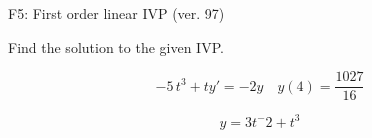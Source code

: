 \begin{exercise}
  \begin{exerciseTitle}F5: First order linear IVP (ver. 97)\end{exerciseTitle}
  \begin{exerciseStatement}
    
Find the solution to the given IVP.

    
\[-5 \, t^{3} +ty'= -2 y \hspace{1em} y( 4 ) = \frac{1027}{16}\]

  \end{exerciseStatement}
  \begin{exerciseAnswer}
    
\[y= 3 t^ -2 + t^{3}\]

  \end{exerciseAnswer}
\end{exercise}